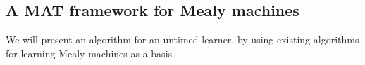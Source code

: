 

\subsection{A MAT framework for Mealy machines}
We will present an algorithm for an untimed learner, by using existing algorithms for learning Mealy machines as a basis.

